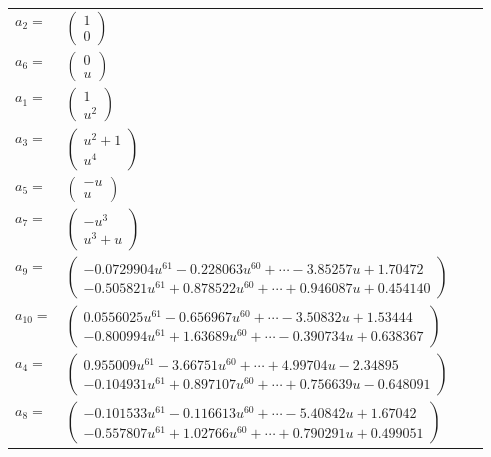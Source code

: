 \documentclass[1p]{elsarticle_modified}
\theoremstyle{definition}
\begin{document}
\begin{tabular}{m{7pt} m{180pt} m{7pt} m{180pt} }
\flushright $a_{2}=$&$\begin{pmatrix}1\\0\end{pmatrix}$ \\
\flushright $a_{6}=$&$\begin{pmatrix}0\\u\end{pmatrix}$ \\
\flushright $a_{1}=$&$\begin{pmatrix}1\\u^2\end{pmatrix}$ \\
\flushright $a_{3}=$&$\begin{pmatrix}u^2+1\\u^4\end{pmatrix}$ \\
\flushright $a_{5}=$&$\begin{pmatrix}- u\\u\end{pmatrix}$ \\
\flushright $a_{7}=$&$\begin{pmatrix}- u^3\\u^3+u\end{pmatrix}$ \\
\flushright $a_{9}=$&$\begin{pmatrix}-0.0729904 u^{61}-0.228063 u^{60}+\cdots-3.85257 u+1.70472\\-0.505821 u^{61}+0.878522 u^{60}+\cdots+0.946087 u+0.454140\end{pmatrix}$ \\
\flushright $a_{10}=$&$\begin{pmatrix}0.0556025 u^{61}-0.656967 u^{60}+\cdots-3.50832 u+1.53444\\-0.800994 u^{61}+1.63689 u^{60}+\cdots-0.390734 u+0.638367\end{pmatrix}$ \\
\flushright $a_{4}=$&$\begin{pmatrix}0.955009 u^{61}-3.66751 u^{60}+\cdots+4.99704 u-2.34895\\-0.104931 u^{61}+0.897107 u^{60}+\cdots+0.756639 u-0.648091\end{pmatrix}$ \\
\flushright $a_{8}=$&$\begin{pmatrix}-0.101533 u^{61}-0.116613 u^{60}+\cdots-5.40842 u+1.67042\\-0.557807 u^{61}+1.02766 u^{60}+\cdots+0.790291 u+0.499051\end{pmatrix}$ \\

\end{tabular}
\end{document}
